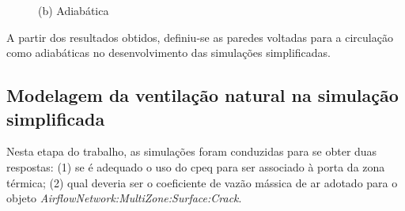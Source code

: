 \documentclass[brazil,hardcopy,openany]{ufscthesis} %
\begin{document}
\begin{figure}[h]
\begin{minipage}{.5\textwidth}
		\begin{center}
			\small{(b) Adiabática}\\
		\end{center}
	\end{minipage}
	\label{fig:szout}
\end{figure}



A partir dos resultados obtidos, definiu-se as paredes voltadas para a circulação como adiabáticas no desenvolvimento das simulações simplificadas.

\subsection{Modelagem da ventilação natural na simulação simplificada}

Nesta etapa do trabalho, as simulações foram conduzidas para se obter duas respostas:
(1) se é adequado o uso do \acrfull{cpeq} para ser associado à porta da zona térmica; (2) qual deveria ser o coeficiente de vazão mássica de ar adotado para o objeto \textit{AirflowNetwork:MultiZone:Surface:Crack}.
\end{document}
